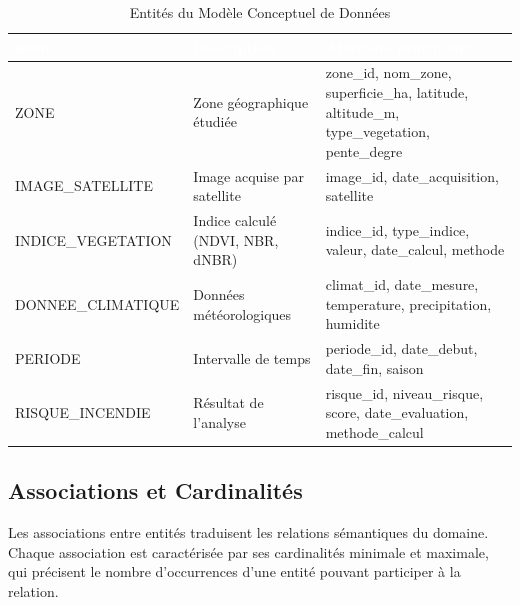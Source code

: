 \documentclass[12pt,a4paper]{report}
\begin{document}
\begin{table}[H]
\centering
{}
\begin{tabularx}{\textwidth}{L{3.5cm} L{4cm} X}
\toprule
{}
\textcolor{white}{\textbf{Entité}} &
\textcolor{white}{\textbf{Description}} &
\textcolor{white}{\textbf{Attributs principaux}} \\
\midrule
ZONE & Zone géographique étudiée &
  zone\_id, nom\_zone, superficie\_ha, latitude, altitude\_m, type\_vegetation, pente\_degre \\
IMAGE\_SATELLITE & Image acquise par satellite &
  image\_id, date\_acquisition, satellite \\
INDICE\_VEGETATION & Indice calculé (NDVI, NBR, dNBR) &
  indice\_id, type\_indice, valeur, date\_calcul, methode \\
DONNEE\_CLIMATIQUE & Données météorologiques &
  climat\_id, date\_mesure, temperature, precipitation, humidite \\
PERIODE & Intervalle de temps &
  periode\_id, date\_debut, date\_fin, saison \\
RISQUE\_INCENDIE & Résultat de l'analyse &
  risque\_id, niveau\_risque, score, date\_evaluation, methode\_calcul \\
\bottomrule
\end{tabularx}
\caption{Entités du Modèle Conceptuel de Données}
\label{tab:entites_mcd}
\end{table}

\subsection{Associations et Cardinalités}

Les associations entre entités traduisent les relations sémantiques du domaine. Chaque association est caractérisée par ses cardinalités minimale et maximale, qui précisent le nombre d'occurrences d'une entité pouvant participer à la relation.
\end{document}
